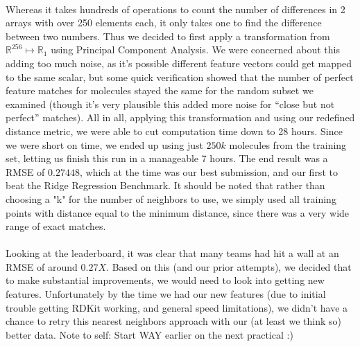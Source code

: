 \documentclass[letterpaper]{article}
\begin{document}
\\
Whereas it takes hundreds of operations to count the number of differences in 2 arrays with over 250 elements each, it only takes one to find the difference between two numbers. Thus we decided to first apply a transformation from $\mathbb{R}^{256} \mapsto \mathbb{R}_{1}$ using Principal Component Analysis. We were concerned about this adding too much noise, as it's possible different feature vectors could get mapped to the same scalar, but some quick verification showed that the number of perfect feature matches for molecules stayed the same for the random subset we examined (though it's very plausible this added more noise for ``close but not perfect'' matches). All in all, applying this transformation and using our redefined distance metric, we were able to cut computation time down to 28 hours. Since we were short on time, we ended up using just $250k$ molecules from the training set, letting us finish this run in a manageable 7 hours. The end result was a RMSE of $0.27448$, which at the time was our best submission, and our first to beat the Ridge Regression Benchmark. It should be noted that rather than choosing a "k" for the number of neighbors to use, we simply used all training points with distance equal to the minimum distance, since there was a very wide range of exact matches.\\
\\
Looking at the leaderboard, it was clear that many teams had hit a wall at an RMSE of around $0.27X$. Based on this (and our prior attempts), we decided that to make substantial improvements, we would need to look into getting new features. Unfortunately by the time we had our new features (due to initial trouble getting RDKit working, and general speed limitations), we didn't have a chance to retry this nearest neighbors approach with our (at least we think so) better data. Note to self: Start WAY earlier on the next practical :)
\end{document}
